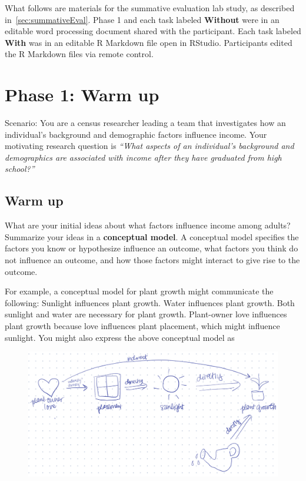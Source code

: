 \normalsize
What follows are materials for the summative evaluation lab study, as described
in~\autoref{sec:summativeEval}. Phase 1 and each task labeled \textbf{Without \rTisane}
were in an editable word processing document shared with the participant. Each
task labeled \textbf{With \rTisane} was in an editable R Markdown file open in RStudio.
Participants edited the R Markdown files via remote control. 

\clearpage 
\section*{Phase 1: Warm up}
Scenario: You are a census researcher leading a team that investigates how an
individual’s background and demographic factors influence income. Your
motivating research question is \textit{``What aspects of an individual’s background and
demographics are associated with income after they have graduated from high
school?''}

\subsection*{Warm up}

What are your initial ideas about what factors influence income among adults?
Summarize your ideas in a \textbf{conceptual model}. A conceptual model specifies the
factors you know or hypothesize influence an outcome, what factors you think do
not influence an outcome, and how those factors might interact to give rise to
the outcome. 

For example, a conceptual model for plant growth might communicate
the following: Sunlight influences plant growth. Water influences plant growth.
Both sunlight and water are necessary for plant growth. Plant-owner love
influences plant growth because love influences plant placement, which might
influence sunlight. You might also express the above conceptual model as

\begin{figure}[H]
    \centering
    \includegraphics[width=.85\linewidth]{tisane/figures/example-conceptual-model.png}
\end{figure}

